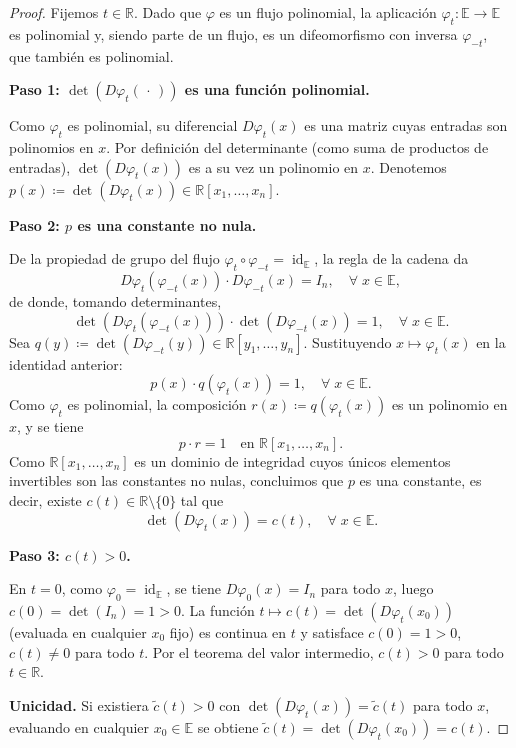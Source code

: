 \documentclass[11pt,a4paper]{article}
\theoremstyle{definition}
\theoremstyle{plain}
\theoremstyle{remark}
\begin{document}
	\begin{proof}
		Fijemos $t \in \mathbb{R}$. Dado que $\varphi$ es un flujo polinomial, la aplicación $\varphi_t : \mathbb{E} \to \mathbb{E}$ es polinomial y, siendo parte de un flujo, es un difeomorfismo con inversa $\varphi_{-t}$, que también es polinomial.

		\textbf{Paso 1: $\det(D\varphi_t(\,\cdot\,))$ es una función polinomial.}

		Como $\varphi_t$ es polinomial, su diferencial $D\varphi_t(x)$ es una matriz cuyas entradas son polinomios en $x$. Por definición del determinante (como suma de productos de entradas), $\det(D\varphi_t(x))$ es a su vez un polinomio en $x$. Denotemos $p(x) \coloneqq \det(D\varphi_t(x)) \in \mathbb{R}[x_1, \dots, x_n]$.

		\textbf{Paso 2: $p$ es una constante no nula.}

		De la propiedad de grupo del flujo $\varphi_t \circ \varphi_{-t} = \operatorname{id}_{\mathbb{E}}$, la regla de la cadena da
		\[
			D\varphi_t\!\left(\varphi_{-t}(x)\right) \cdot D\varphi_{-t}(x) = I_n, \quad \forall \; x \in \mathbb{E},
		\]
		de donde, tomando determinantes,
		\[
			\det\!\left(D\varphi_t(\varphi_{-t}(x))\right) \cdot \det\!\left(D\varphi_{-t}(x)\right) = 1, \quad \forall \; x \in \mathbb{E}.
		\]
		Sea $q(y) \coloneqq \det(D\varphi_{-t}(y)) \in \mathbb{R}[y_1, \dots, y_n]$. Sustituyendo $x \mapsto \varphi_t(x)$ en la identidad anterior:
		\[
			p(x) \cdot q\!\left(\varphi_t(x)\right) = 1, \quad \forall \; x \in \mathbb{E}.
		\]
		Como $\varphi_t$ es polinomial, la composición $r(x) \coloneqq q(\varphi_t(x))$ es un polinomio en $x$, y se tiene
		\[
			p \cdot r = 1 \quad \text{en } \mathbb{R}[x_1, \dots, x_n].
		\]
		Como $\mathbb{R}[x_1, \dots, x_n]$ es un dominio de integridad cuyos únicos elementos invertibles son las constantes no nulas, concluimos que $p$ es una constante, es decir, existe $c(t) \in \mathbb{R}\setminus\{0\}$ tal que
		\[
			\det(D\varphi_t(x)) = c(t), \quad \forall \; x \in \mathbb{E}.
		\]

		\textbf{Paso 3: $c(t) > 0$.}

		En $t = 0$, como $\varphi_0 = \operatorname{id}_{\mathbb{E}}$, se tiene $D\varphi_0(x) = I_n$ para todo $x$, luego $c(0) = \det(I_n) = 1 > 0$. La función $t \mapsto c(t) = \det(D\varphi_t(x_0))$ (evaluada en cualquier $x_0$ fijo) es continua en $t$ y satisface $c(0) = 1 > 0$, $c(t) \neq 0$ para todo $t$. Por el teorema del valor intermedio, $c(t) > 0$ para todo $t \in \mathbb{R}$.

		\textbf{Unicidad.} Si existiera $\tilde{c}(t) > 0$ con $\det(D\varphi_t(x)) = \tilde{c}(t)$ para todo $x$, evaluando en cualquier $x_0 \in \mathbb{E}$ se obtiene $\tilde{c}(t) = \det(D\varphi_t(x_0)) = c(t)$.
	\end{proof}
\end{document}
